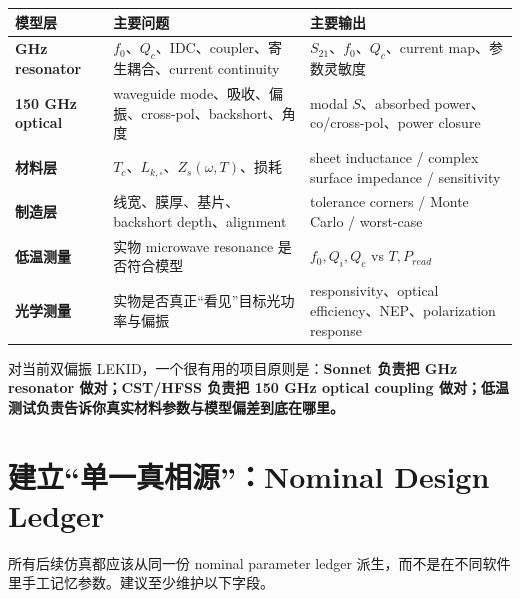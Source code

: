 \documentclass[11pt,a4paper,openany]{ctexrep}
\begin{document}
\begin{center}
\begin{tabularx}{\textwidth}{>{\bfseries}p{2.4cm} X X}
\toprule
模型层 & 主要问题 & 主要输出 \\
\midrule
GHz resonator & $f_0$、$Q_c$、IDC、coupler、寄生耦合、current continuity & $S_{21}$、$f_0$、$Q_c$、current map、参数灵敏度 \\
150 GHz optical & waveguide mode、吸收、偏振、cross-pol、backshort、角度 & modal $S$、absorbed power、co/cross-pol、power closure \\
材料层 & $T_c$、$L_{k,\square}$、$Z_s(\omega,T)$、损耗 & sheet inductance / complex surface impedance / sensitivity \\
制造层 & 线宽、膜厚、基片、backshort depth、alignment & tolerance corners / Monte Carlo / worst-case \\
低温测量 & 实物 microwave resonance 是否符合模型 & $f_0,Q_i,Q_c$ vs $T,P_{read}$ \\
光学测量 & 实物是否真正“看见”目标光功率与偏振 & responsivity、optical efficiency、NEP、polarization response \\
\bottomrule
\end{tabularx}
\end{center}

\begin{projectbox}
对当前双偏振 LEKID，一个很有用的项目原则是：\textbf{Sonnet 负责把 GHz resonator 做对；CST/HFSS 负责把 150 GHz optical coupling 做对；低温测试负责告诉你真实材料参数与模型偏差到底在哪里。}
\end{projectbox}

\section{建立“单一真相源”：Nominal Design Ledger}

所有后续仿真都应该从同一份 nominal parameter ledger 派生，而不是在不同软件里手工记忆参数。建议至少维护以下字段。
\end{document}
